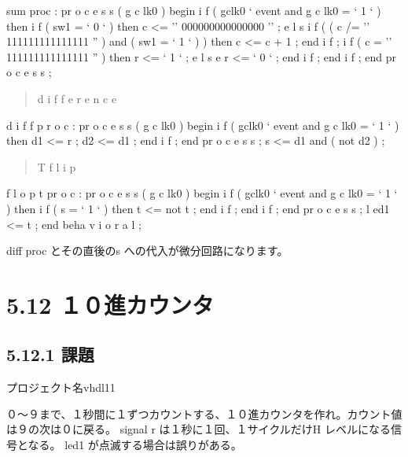 \documentclass[letterpaper,10pt,dvipdfmx]{sphinxmanual}
\begin{document}
sum proc : pr o c e s s ( g c lk0 )
begin
i f ( gclk0 ` event and g c lk0 = ` 1 ` ) then
i f ( sw1 = ` 0 ` ) then
c \textless{}= '' 000000000000000 '' ;
e l s i f ( ( c /= '' 111111111111111 '' ) and ( sw1 = ` 1 ` ) ) then
c \textless{}= c + 1 ;
end i f ;
i f ( c = '' 111111111111111 '' ) then
r \textless{}= ` 1 ` ;
e l s e
r \textless{}= ` 0 ` ;
end i f ;
end i f ;
end pr o c e s s ;
\begin{quote}

d i f f e r e n c e
\end{quote}

d i f f p r o c : pr o c e s s ( g c lk0 )
begin
i f ( gclk0 ` event and g c lk0 = ` 1 ` ) then
d1 \textless{}= r ;
d2 \textless{}= d1 ;
end i f ;
end pr o c e s s ;
s \textless{}= d1 and ( not d2 ) ;
\begin{quote}

T f l i p
\end{quote}

f l o p t pr o c : pr o c e s s ( g c lk0 )
begin
i f ( gclk0 ` event and g c lk0 = ` 1 ` ) then
i f ( s = ` 1 ` ) then
t \textless{}= not t ;
end i f ;
end i f ;
end pr o c e s s ;
l ed1 \textless{}= t ;
end beha v i o r a l ;

diff proc とその直後のs への代入が微分回路になります。


\section{5.12 １０進カウンタ}
\label{05_try:id20}

\subsection{5.12.1 課題}
\label{05_try:id21}
プロジェクト名vhdl11

０～９まで、１秒間に１ずつカウントする、１０進カウンタを作れ。カウント値は９の次は０に戻る。
signal r は１秒に１回、１サイクルだけH レベルになる信号となる。
led1 が点滅する場合は誤りがある。
\end{document}
